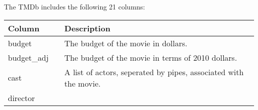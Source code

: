 \documentclass[11pt]{article}
\begin{document}
The TMDb includes the following 21 columns:

\begin{longtable}[]{@{}lll@{}}
\toprule
\begin{minipage}[b]{0.28\columnwidth}\raggedright\strut
Column\strut
\end{minipage} & \begin{minipage}[b]{0.05\columnwidth}\raggedright\strut
\strut
\end{minipage} & \begin{minipage}[b]{0.28\columnwidth}\raggedright\strut
Description\strut
\end{minipage}\tabularnewline
\midrule
\endhead
\begin{minipage}[t]{0.28\columnwidth}\raggedright\strut
budget\strut
\end{minipage} & \begin{minipage}[t]{0.05\columnwidth}\raggedright\strut
\strut
\end{minipage} & \begin{minipage}[t]{0.28\columnwidth}\raggedright\strut
The budget of the movie in dollars.\strut
\end{minipage}\tabularnewline
\begin{minipage}[t]{0.28\columnwidth}\raggedright\strut
budget\_adj\strut
\end{minipage} & \begin{minipage}[t]{0.05\columnwidth}\raggedright\strut
\strut
\end{minipage} & \begin{minipage}[t]{0.28\columnwidth}\raggedright\strut
The budget of the movie in terms of 2010 dollars.\strut
\end{minipage}\tabularnewline
\begin{minipage}[t]{0.28\columnwidth}\raggedright\strut
cast\strut
\end{minipage} & \begin{minipage}[t]{0.05\columnwidth}\raggedright\strut
\strut
\end{minipage} & \begin{minipage}[t]{0.28\columnwidth}\raggedright\strut
A list of actors, seperated by pipes, associated with the movie.\strut
\end{minipage}\tabularnewline
\begin{minipage}[t]{0.28\columnwidth}\raggedright\strut
director\strut
\end{minipage} & \begin{minipage}[t]{0.05\columnwidth}\raggedright\strut

\end{minipage}
\end{longtable}
\end{document}
